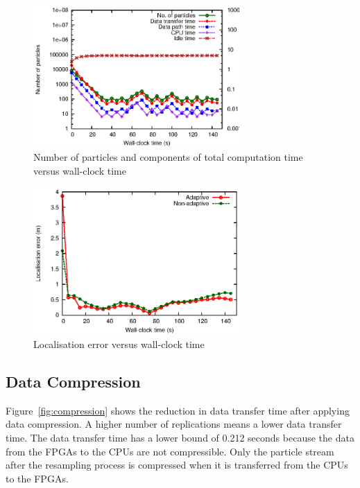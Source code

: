 \begin{figure}[t!]
\centering
\includegraphics[width=0.7\textwidth]{runtime_reconfiguration/figures/fig_adaptive}
\caption{Number of particles and components of total computation time versus wall-clock time}
\label{fig:adaptive}
\end{figure}

\begin{figure}[t!]
\centering
\includegraphics[width=0.7\textwidth]{runtime_reconfiguration/figures/fig_error}
\caption{Localisation error versus wall-clock time}
\label{fig:error}
\end{figure}

\subsection{Data Compression}
Figure~\ref{fig:compression} shows the reduction in data transfer time after applying data compression.
A higher number of replications means a lower data transfer time.
The data transfer time has a lower bound of 0.212 seconds because the data from the FPGAs to the CPUs are not compressible.
Only the particle stream after the resampling process is compressed when it is transferred from the CPUs to the FPGAs.


